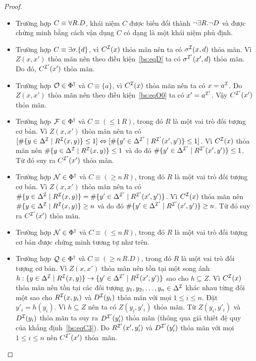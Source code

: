 \begin{proof}
\begin{itemize}
		\item Trường hợp $C \equiv \forall R.D$, khái niệm $C$ được biến đổi thành $\neg \exists R.\neg D$ và được chứng minh bằng cách vận dụng $C$ có dạng là một khái niệm phủ định.
		
		\item Trường hợp $C \equiv \exists \sigma.\{d\}$, vì $C^{\mathcal{I}}(x)$ thỏa mãn nên ta có $\sigma^{\mathcal{I}}(x, d)$ thỏa mãn. Vì $Z(x,x')$ thỏa mãn nên theo điều kiện~\eqref{bs:eqD} ta có $\sigma^{\mathcal{I}'}(x',d)$ thỏa mãn. Do đó, $C^{\mathcal{I}'}(x')$ thỏa mãn.
		
		\item Trường hợp $\mathcal{O} \in \Phi^\dag$ và $C \equiv \{a\}$, vì $C^{\mathcal{I}}(x)$ thỏa mãn nên ta có $x=a^{\mathcal{I}}$. Do $Z(x,x')$ thỏa mãn nên theo điều kiện~\eqref{bs:eqO0} ta có $x' = a^{\mathcal{I}'}$. Vậy $C^{\mathcal{I}'}(x')$ thỏa mãn.
		
		\item Trường hợp $\mathcal{F} \in \Phi^\dag$ và $C \equiv (\leq 1\,R)$, trong đó $R$ là một vai trò đối tượng cơ bản. Vì $Z(x,x')$ thỏa mãn nên ta có $[\#\{y \in \Delta^{\mathcal{I}} \mid R^{\mathcal{I}}(x,y)\} \leq 1] \Leftrightarrow [\#\{y' \in \Delta^{\mathcal{I}'} \mid R^{\mathcal{I}'}(x',y')\} \leq 1]$. Vì $C^{\mathcal{I}}(x)$ thỏa mãn nên $\#\{y \in \Delta^{\mathcal{I}} \mid R^{\mathcal{I}}(x,y)\} \leq 1$ và do đó $\#\{y' \in \Delta^{\mathcal{I}'} \mid R^{\mathcal{I}'}(x',y')\} \leq 1$. Từ đó suy ra $C^{\mathcal{I}'}(x')$ thỏa mãn.
		
		\item Trường hợp $\mathcal{N} \in \Phi^\dag$ và $C \equiv (\geq n\,R)$, trong đó $R$ là một vai trò đối tượng cơ bản. Vì $Z(x,x')$ thỏa mãn nên ta có $\#\{y \in \Delta^{\mathcal{I}} \mid R^{\mathcal{I}}(x,y)\} = \#\{y' \in \Delta^{\mathcal{I}'} \mid R^{\mathcal{I}'}(x',y')\}$. Vì $C^{\mathcal{I}}(x)$ thỏa mãn nên $\#\{y \in \Delta^{\mathcal{I}} \mid R^{\mathcal{I}}(x,y)\} \geq n$ và do đó $\#\{y' \in \Delta^{\mathcal{I}'} \mid R^{\mathcal{I}'}(x',y')\} \geq n$. Từ đó suy ra $C^{\mathcal{I}'}(x')$ thỏa mãn.
		
		\item Trường hợp $\mathcal{N} \in \Phi^\dag$ và $C \equiv (\leq n\,R)$, trong đó $R$ là một vai trò đối tượng cơ bản được chứng minh tương tự như trên.
		
		\item Trường hợp $\mathcal{Q} \in \Phi^\dag$ và $C \equiv (\geq n\,R.D)$, trong đó $R$ là một vai trò đối tượng cơ bản. Vì $Z(x,x')$ thỏa mãn nên tồn tại một song ánh $h : \{y \in \Delta^{\mathcal{I}} \mid R^{\mathcal{I}}(x,y)\} \rightarrow \{y' \in \Delta^{\mathcal{I}'} \mid R^{\mathcal{I}}(x',y')\}$ sao cho $h \subseteq Z$. Vì $C^{\mathcal{I}}(x)$ thỏa mãn nên tồn tại các đối tượng $y_1, y_2, \ldots, y_n \in \Delta^{\mathcal{I}}$ khác nhau từng đôi một sao cho $R^{\mathcal{I}}(x, y_i)$ và $D^{\mathcal{I}}(y_i)$ thỏa mãn với mọi $1 \leq i \leq n$. Đặt $y'_i = h(y_i)$. Vì $h \subseteq Z$ nên ta có $Z(y_i, y'_i)$ thỏa mãn. Từ $Z(y_i, y'_i)$ và $D^{\mathcal{I}}(y_i)$ thỏa mãn ta suy ra $D^{\mathcal{I}'}(y'_i)$ thỏa mãn (thông qua giả thiết đệ quy của khẳng định~\eqref{bs:eqC3}). Do $R^{\mathcal{I}'}(x', y'_i)$ và $D^{\mathcal{I}'}(y'_i)$ thỏa mãn với mọi $1 \leq i \leq n$ nên $C^{\mathcal{I}'}(x')$ thỏa~mãn.
		

\end{itemize}
\end{proof}
